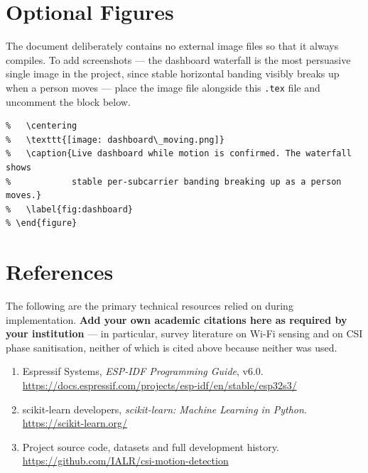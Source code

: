 \documentclass[11pt,a4paper]{article}
\newcommand{\code}[1]{\texttt{\small #1}}
\begin{document}
\section{Optional Figures}

The document deliberately contains no external image files so that it always
compiles. To add screenshots --- the dashboard waterfall is the most
persuasive single image in the project, since stable horizontal banding
visibly breaks up when a person moves --- place the image file alongside this
\code{.tex} file and uncomment the block below.

\begin{lstlisting}[caption={Template for adding a screenshot.}]
% \begin{figure}[H]
%   \centering
%   \texttt{[image: dashboard\_moving.png]}
%   \caption{Live dashboard while motion is confirmed. The waterfall shows
%            stable per-subcarrier banding breaking up as a person moves.}
%   \label{fig:dashboard}
% \end{figure}
\end{lstlisting}

\section*{References}

\noindent
The following are the primary technical resources relied on during
implementation. \textbf{Add your own academic citations here as required by your
institution} --- in particular, survey literature on Wi-Fi sensing and on CSI
phase sanitisation, neither of which is cited above because neither was used.

\begin{enumerate}[leftmargin=1.6em, itemsep=3pt]
  \item Espressif Systems, \textit{ESP-IDF Programming Guide}, v6.0.
        \url{https://docs.espressif.com/projects/esp-idf/en/stable/esp32s3/}
  \item scikit-learn developers, \textit{scikit-learn: Machine Learning in
        Python}. \url{https://scikit-learn.org/}
  \item Project source code, datasets and full development history.
        \url{https://github.com/IALR/csi-motion-detection}
\end{enumerate}
\end{document}
